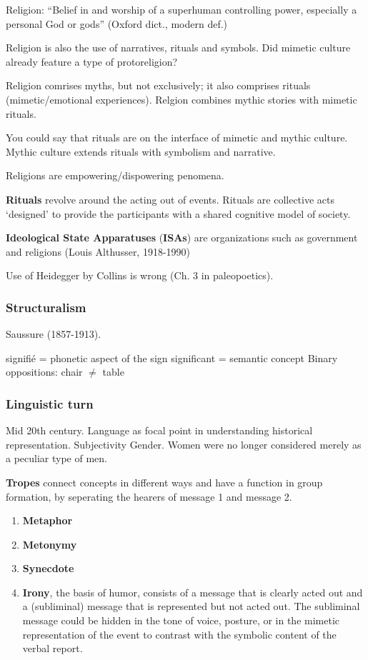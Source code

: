 \documentclass{article}
\begin{document}
Religion: “Belief in and worship of a superhuman controlling power, especially a personal God or gods” (Oxford dict., modern def.)

Religion is also the use of narratives, rituals and symbols. Did mimetic culture already feature a type of protoreligion?

Religion comrises myths, but not exclusively; it also comprises rituals (mimetic/emotional experiences).
Relgion combines mythic stories with mimetic rituals.

You could say that rituals are on the interface of mimetic and mythic culture. Mythic culture extends rituals with symbolism and narrative.

Religions are empowering/dispowering penomena.

\textbf{Rituals} revolve around the acting out of events. Rituals are collective acts ‘designed’ to provide the participants with a shared cognitive model of society. 

\textbf{Ideological State Apparatuses} (\textbf{ISAs}) are organizations such as government and religions (Louis Althusser, 1918-1990)

Use of Heidegger by Collins is wrong (Ch. 3 in paleopoetics).

\subsubsection{Structuralism}

Saussure (1857-1913).

signifi\'{e} = phonetic aspect of the sign
significant = semantic concept
Binary oppositions: chair $\ne$ table

\subsubsection{Linguistic turn}

Mid 20th century.
Language as focal point  in understanding historical representation.
Subjectivity
Gender. Women were no longer considered merely as a peculiar type of men.

\textbf{Tropes} connect concepts in different ways and have a function in group formation, by seperating the hearers of message 1 and message 2.

\begin{enumerate}
  \item \textbf{Metaphor}
  \item \textbf{Metonymy}
  \item \textbf{Synecdote}
  \item \textbf{Irony}, the basis of humor, consists of a message that is clearly acted out and a (subliminal) message that is represented but not acted out. The subliminal message could be hidden in the tone of voice, posture, or in the mimetic representation of the event to contrast with the symbolic content of the verbal report.
\end{enumerate}
\end{document}
